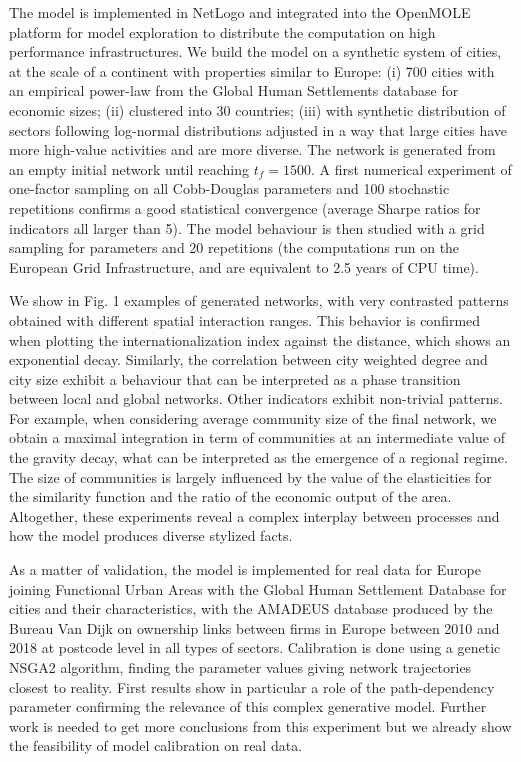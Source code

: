 \documentclass[10pt,letterpaper]{article}
\begin{document}
The model is implemented in NetLogo and integrated into the OpenMOLE platform for model exploration to distribute the computation on high performance infrastructures. We build the model on a synthetic system of cities, at the scale of a continent with properties similar to Europe: (i) 700 cities with an empirical power-law from the Global Human Settlements database for economic sizes; (ii) clustered into 30 countries; (iii) with synthetic distribution of sectors following log-normal distributions adjusted in a way that large cities have more high-value activities and are more diverse. The network is generated from an empty initial network until reaching $t_f=1500$. A first numerical experiment of one-factor sampling on all Cobb-Douglas parameters and 100 stochastic repetitions confirms a good statistical convergence (average Sharpe ratios for indicators all larger than 5). The model behaviour is then studied with a grid sampling for parameters and 20 repetitions (the computations run on the European Grid Infrastructure, and are equivalent to 2.5 years of CPU time).

We show in Fig. 1 examples of generated networks, with very contrasted patterns obtained with different spatial interaction ranges. This behavior is confirmed when plotting the internationalization index against the distance, which shows an exponential decay. Similarly, the correlation between city weighted degree and city size exhibit a behaviour that can be interpreted as a phase transition between local and global networks. Other indicators exhibit non-trivial patterns. For example, when considering average community size of the final network, we obtain a maximal integration in term of communities at an intermediate value of the gravity decay, what can be interpreted as the emergence of a regional regime. The size of communities is largely influenced by the value of the elasticities for the similarity function and the ratio of the economic output of the area. Altogether, these experiments reveal a complex interplay between processes and how the model produces diverse stylized facts.

As a matter of validation, the model is implemented for real data for Europe joining Functional Urban Areas with the Global Human Settlement Database for cities and their characteristics, with the AMADEUS database produced by the Bureau Van Dijk on ownership links between firms in Europe between 2010 and 2018 at postcode level in all types of sectors. Calibration is done using a genetic NSGA2 algorithm, finding the parameter values giving network trajectories closest to reality. First results show in particular a role of the path-dependency parameter confirming the relevance of this complex generative model. Further work is needed to get more conclusions from this experiment but we already show the feasibility of model calibration on real data.
\end{document}
